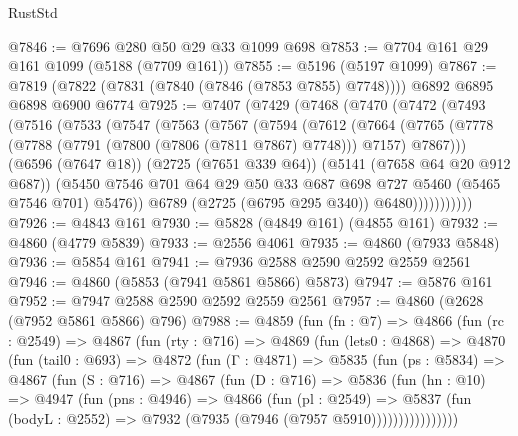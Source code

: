 \begin{lexlean}{RustStd}
\begin{coremodule}
@7846 := @7696 @280 @50 @29 @33 @1099 @698
@7853 := @7704 @161 @29 @161 @1099 (@5188 (@7709 @161))
@7855 := @5196 (@5197 @1099)
@7867 := @7819 (@7822 (@7831 (@7840 (@7846 (@7853 @7855) @7748)))) @6892 @6895 @6898 @6900 @6774
@7925 := @7407
    (@7429
      (@7468
        (@7470
          (@7472
            (@7493
              (@7516
                (@7533
                  (@7547
                    (@7563
                      (@7567
                        (@7594
                          (@7612
                            (@7664
                              (@7765
                                (@7778
                                  (@7788 (@7791 (@7800 (@7806 (@7811 @7867) @7748))) @7157)
                                  @7867)))
                            (@6596 (@7647 @18))
                            (@2725 (@7651 @339 @64))
                            (@5141 (@7658 @64 @20 @912 @687))
                            (@5450
                              @7546
                              @701
                              @64
                              @29
                              @50
                              @33
                              @687
                              @698
                              @727
                              @5460
                              (@5465 @7546 @701)
                              @5476))
                          @6789
                          (@2725 (@6795 @295 @340))
                          @6480)))))))))))
@7926 := @4843 @161
@7930 := @5828 (@4849 @161) (@4855 @161)
@7932 := @4860 (@4779 @5839)
@7933 := @2556 @4061
@7935 := @4860 (@7933 @5848)
@7936 := @5854 @161
@7941 := @7936 @2588 @2590 @2592 @2559 @2561
@7946 := @4860 (@5853 (@7941 @5861 @5866) @5873)
@7947 := @5876 @161
@7952 := @7947 @2588 @2590 @2592 @2559 @2561
@7957 := @4860 (@2628 (@7952 @5861 @5866) @796)
@7988 := @4859
    (fun (fn : @7) =>
    @4866
      (fun (rc : @2549) =>
      @4867
        (fun (rty : @716) =>
        @4869
          (fun (lets0 : @4868) =>
          @4870
            (fun (tail0 : @693) =>
            @4872
              (fun (Γ : @4871) =>
              @5835
                (fun (ps : @5834) =>
                @4867
                  (fun (S : @716) =>
                  @4867
                    (fun (D : @716) =>
                    @5836
                      (fun (hn : @10) =>
                      @4947
                        (fun (pns : @4946) =>
                        @4866
                          (fun (pl : @2549) =>
                          @5837
                            (fun (bodyL : @2552) => @7932 (@7935 (@7946 (@7957 @5910))))))))))))))))

\end{coremodule}
\end{lexlean}
